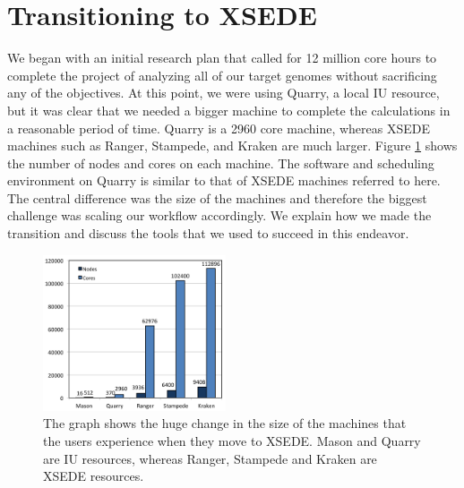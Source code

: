 \documentclass{sig-alternate}
\newcommand{\abhi}[1]{ {\textcolor{red} { ***Abhinav: #1 }}}
\newcommand{\abhi}[1]{ {}}
\begin{document}
\section{Transitioning to XSEDE}\label{sec:resources}
We began with an initial research plan that called for 12 million core hours to complete the project of
analyzing all of our target genomes without sacrificing any of the objectives. At this point, we were using
Quarry, a local IU resource, but it was clear that we needed a bigger machine to complete the calculations in
a reasonable period of time. Quarry is a 2960 core machine, whereas XSEDE machines such as Ranger, Stampede,
and Kraken are much larger. Figure \ref{fig:scaling} shows the number of nodes and cores on each machine. The
software and scheduling environment on Quarry is similar to that of XSEDE machines referred to here. The
central difference was the size of the machines and therefore the biggest challenge was scaling our workflow
accordingly. We explain how we made the transition and discuss the tools that we used to succeed in this endeavor.
%


\begin{figure} %
\centering
\includegraphics[width=0.48\textwidth]{figures/cores-nodes.png}
\caption{The graph shows the huge change in the size of the machines that the users experience when they move to XSEDE. Mason and Quarry are IU resources, whereas Ranger, Stampede and Kraken are XSEDE resources. }
\label{fig:scaling}
\end{figure}
\end{document}
